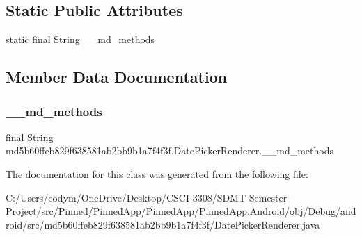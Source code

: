 \subsection*{Static Public Attributes}
\begin{DoxyCompactItemize}
\item 
static final String \hyperlink{classmd5b60ffeb829f638581ab2bb9b1a7f4f3f_1_1_date_picker_renderer_adb56115e96abb1e11b6f6ceebbadb704}{\+\_\+\+\_\+md\+\_\+methods}
\end{DoxyCompactItemize}


\subsection{Member Data Documentation}
\mbox{\label{classmd5b60ffeb829f638581ab2bb9b1a7f4f3f_1_1_date_picker_renderer_adb56115e96abb1e11b6f6ceebbadb704}} 
\subsubsection{\texorpdfstring{\+\_\+\+\_\+md\+\_\+methods}{\_\_md\_methods}}
{\footnotesize\ttfamily final String md5b60ffeb829f638581ab2bb9b1a7f4f3f.\+Date\+Picker\+Renderer.\+\_\+\+\_\+md\+\_\+methods\hspace{0.3cm}{\ttfamily [static]}}



The documentation for this class was generated from the following file\+:\begin{DoxyCompactItemize}
\item 
C\+:/\+Users/codym/\+One\+Drive/\+Desktop/\+C\+S\+C\+I 3308/\+S\+D\+M\+T-\/\+Semester-\/\+Project/src/\+Pinned/\+Pinned\+App/\+Pinned\+App/\+Pinned\+App.\+Android/obj/\+Debug/android/src/md5b60ffeb829f638581ab2bb9b1a7f4f3f/Date\+Picker\+Renderer.\+java\end{DoxyCompactItemize}
